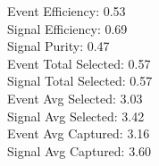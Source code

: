 Event  Efficiency:     0.53\\
Signal Efficiency:     0.69\\
Signal Purity:         0.47\\
Event  Total Selected: 0.57\\
Signal Total Selected: 0.57\\
Event  Avg Selected:   3.03\\
Signal Avg Selected:   3.42\\
Event  Avg Captured:   3.16\\
Signal Avg Captured:   3.60